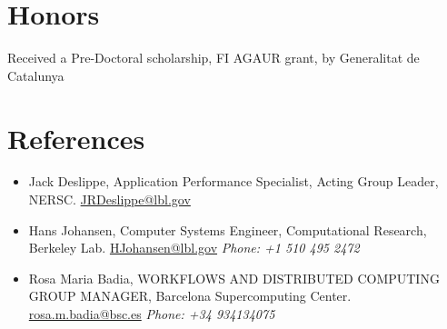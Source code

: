 \documentclass[margin]{res}
\begin{document}
\begin{resume}
\section{Honors}
Received a Pre-Doctoral scholarship, FI AGAUR grant,  by Generalitat de Catalunya

%
\section{References}
\begin{itemize}
    \item Jack Deslippe, Application Performance Specialist, Acting Group Leader, NERSC. \url{JRDeslippe@lbl.gov}
    \item Hans Johansen, Computer Systems Engineer, Computational Research, Berkeley Lab. \url{HJohansen@lbl.gov} \textit{Phone: +1 510 495 2472}
    \item Rosa Maria Badia, WORKFLOWS AND DISTRIBUTED COMPUTING GROUP MANAGER, Barcelona Supercomputing Center. \url{ rosa.m.badia@bsc.es} \textit{Phone: +34 934134075}
\end{itemize}

\end{resume}
%
\end{document}
